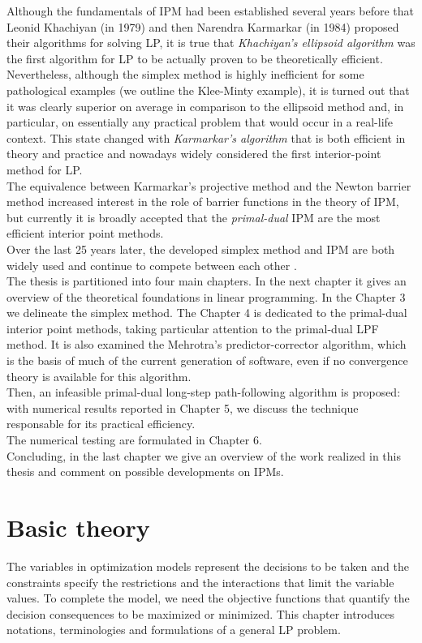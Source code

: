 \documentclass[a4paper,10 pt,titlepage,twoside]{book}
\theoremstyle{plain}
\theoremstyle{definition}
\theoremstyle{remark}
\begin{document}
Although the fundamentals of IPM had been established several years before that Leonid Khachiyan (in 1979) and then Narendra Karmarkar (in 1984) proposed their algorithms for solving LP, it is true that \textit{Khachiyan’s ellipsoid algorithm} was the first algorithm for LP to be actually proven to be theoretically efficient. Nevertheless, although the simplex method is highly inefficient for some pathological examples (we outline the Klee-Minty example), it is turned out that it was clearly superior on average in comparison to the ellipsoid method and, in particular, on essentially any practical problem that would occur in a real-life context. This state changed with \textit{Karmarkar’s algorithm} that is both efficient in theory and practice and nowadays widely considered the first interior-point method for LP.\\
The equivalence between Karmarkar's projective method and the Newton barrier method increased interest in the role of barrier functions in the theory of IPM, but currently it is broadly accepted that the \textit{primal-dual} IPM are the most efficient interior point methods.\\
Over the last 25 years later, the developed simplex method and IPM are both widely used and continue to compete between each other \cite{25y}. \\
The thesis is partitioned into four main chapters.
In the next chapter it gives an overview of the theoretical foundations in linear programming. In the Chapter 3 we delineate the simplex method. The Chapter 4 is dedicated to the primal-dual interior point methods, taking particular attention to the primal-dual LPF method. It is also examined the Mehrotra's predictor-corrector algorithm, which is the basis of much of the current generation of software, even if no convergence theory is available for this algorithm.\\
Then, an infeasible primal-dual long-step path-following algorithm is proposed: with numerical results reported in Chapter 5, we discuss the technique responsable for its practical efficiency.\\
The numerical testing are formulated in Chapter 6.\\
Concluding, in the last chapter we give an overview of the work realized in this thesis and comment on possible developments on IPMs. 

%
%

\chapter{Basic theory}
The variables in optimization models represent the decisions to be taken and the constraints specify the restrictions and the interactions that limit the variable values.
To complete the model, we need the objective functions that quantify the decision consequences to be maximized or minimized. This chapter introduces notations, terminologies and formulations of a general LP problem.
\end{document}
